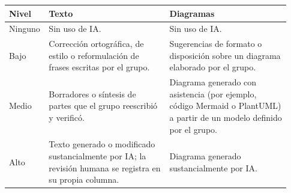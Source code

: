 \documentclass[11pt]{article}
\begin{document}
\begin{tabular}{@{}p{0.069\linewidth}p{0.429\linewidth}p{0.429\linewidth}@{}}
\toprule Nivel & Texto & Diagramas \\
\midrule
Ninguno & Sin uso de IA. & Sin uso de IA. \\
Bajo & Corrección ortográfica, de estilo o reformulación de frases escritas por el grupo. & Sugerencias de formato o disposición sobre un diagrama elaborado por el grupo. \\
Medio & Borradores o síntesis de partes que el grupo reescribió y verificó. & Diagrama generado con asistencia (por ejemplo, código Mermaid o PlantUML) a partir de un modelo definido por el grupo. \\
Alto & Texto generado o modificado sustancialmente por IA; la revisión humana se registra en su propia columna. & Diagrama generado sustancialmente por IA. \\
\bottomrule
\end{tabular}

\ossFinalPage
\end{document}
